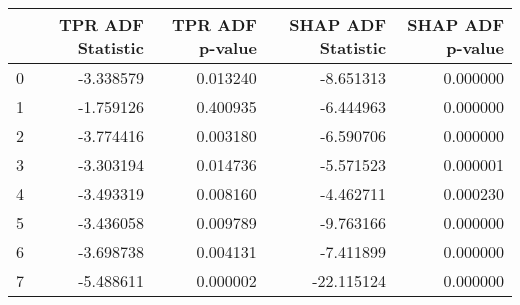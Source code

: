 \begin{tabular}{lrrrr}
\toprule
 & TPR ADF Statistic & TPR ADF p-value & SHAP ADF Statistic & SHAP ADF p-value \\
\midrule
0 & -3.338579 & 0.013240 & -8.651313 & 0.000000 \\
1 & -1.759126 & 0.400935 & -6.444963 & 0.000000 \\
2 & -3.774416 & 0.003180 & -6.590706 & 0.000000 \\
3 & -3.303194 & 0.014736 & -5.571523 & 0.000001 \\
4 & -3.493319 & 0.008160 & -4.462711 & 0.000230 \\
5 & -3.436058 & 0.009789 & -9.763166 & 0.000000 \\
6 & -3.698738 & 0.004131 & -7.411899 & 0.000000 \\
7 & -5.488611 & 0.000002 & -22.115124 & 0.000000 \\
\bottomrule
\end{tabular}
